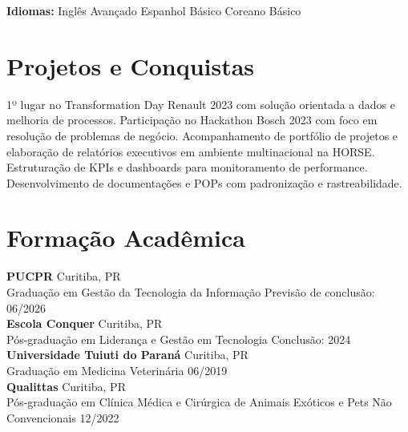 \documentclass[11pt,a4paper]{article}
\begin{document}
\textbf{Idiomas:} Inglês Avançado \enspace\textbullet\enspace Espanhol Básico \enspace\textbullet\enspace Coreano Básico

\section{Projetos e Conquistas}

1º lugar no Transformation Day Renault 2023 com solução orientada a dados e melhoria de processos. Participação no Hackathon Bosch 2023 com foco em resolução de problemas de negócio. Acompanhamento de portfólio de projetos e elaboração de relatórios executivos em ambiente multinacional na HORSE. Estruturação de KPIs e dashboards para monitoramento de performance. Desenvolvimento de documentações e POPs com padronização e rastreabilidade.

\section{Formação Acadêmica}

\textbf{PUCPR} \hfill Curitiba, PR\\
Graduação em Gestão da Tecnologia da Informação \hfill Previsão de conclusão: 06/2026\\[6pt]

\textbf{Escola Conquer} \hfill Curitiba, PR\\
Pós-graduação em Liderança e Gestão em Tecnologia \hfill Conclusão: 2024\\[6pt]

\textbf{Universidade Tuiuti do Paraná} \hfill Curitiba, PR\\
Graduação em Medicina Veterinária \hfill 06/2019\\[6pt]

\textbf{Qualittas} \hfill Curitiba, PR\\
Pós-graduação em Clínica Médica e Cirúrgica de Animais Exóticos e Pets Não Convencionais \hfill 12/2022
\end{document}
